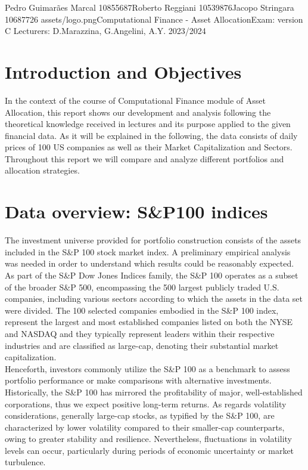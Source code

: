 \documentclass{assignment}
\begin{document}
{Pedro Guimarães Marcal 10855687}{Roberto Reggiani 10539876}{Jacopo Stringara 10687726}
{assets/logo.png}{Computational Finance - Asset Allocation}{Exam: version C} 
{Lecturers: D.Marazzina, G.Angelini, A.Y. 2023/2024}

\section*{Introduction and Objectives}
In the context of the course of Computational Finance module of Asset Allocation, this report shows
our development and analysis following the theoretical knowledge received in lectures and its
purpose applied to the given financial data. As it will be explained in the following, the data
consists of daily prices of 100 US companies as well as their Market Capitalization and Sectors. \\
Throughout this report we will compare and analyze different portfolios and allocation strategies.

\section*{Data overview: S\&P100 indices}
The investment universe provided for portfolio construction consists of the assets included in the
S\&P 100 stock market index. A preliminary empirical analysis was needed in order to understand
which results could be reasonably expected.\\
As part of the S\&P Dow Jones Indices family, the S\&P 100 operates as a subset of the broader S\&P
500, encompassing the 500 largest publicly traded U.S. companies, including various sectors
according to which the assets in the data set were divided. The 100 selected companies embodied in
the S\&P 100 index, represent the largest and most established companies listed on both the NYSE
and NASDAQ and they typically represent leaders within their respective industries and are
classified as large-cap, denoting their substantial market capitalization.\\
Henceforth, investors commonly utilize the S\&P 100 as a benchmark to assess portfolio performance
or make comparisons with alternative investments. Historically, the S\&P 100 has mirrored the
profitability of major, well-established corporations, thus we expect positive long-term returns.
As regards volatility considerations, generally large-cap stocks, as typified by the S\&P 100, are
characterized by lower volatility compared to their smaller-cap counterparts, owing to greater
stability and resilience.  Nevertheless, fluctuations in volatility levels can occur, particularly
during periods of economic uncertainty or market turbulence.
\end{document}
